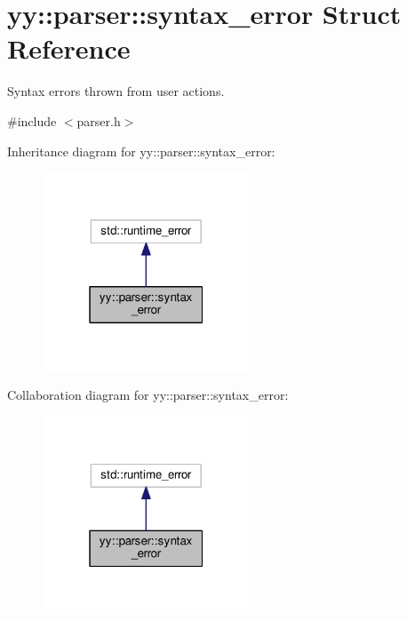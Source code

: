 \hypertarget{structyy_1_1parser_1_1syntax__error}{}\section{yy\+:\+:parser\+:\+:syntax\+\_\+error Struct Reference}
\label{structyy_1_1parser_1_1syntax__error}


Syntax errors thrown from user actions.  




{\ttfamily \#include $<$parser.\+h$>$}



Inheritance diagram for yy\+:\+:parser\+:\+:syntax\+\_\+error\+:
\nopagebreak
\begin{figure}[H]
\begin{center}
\leavevmode
\includegraphics[width=175pt]{structyy_1_1parser_1_1syntax__error__inherit__graph}
\end{center}
\end{figure}


Collaboration diagram for yy\+:\+:parser\+:\+:syntax\+\_\+error\+:
\nopagebreak
\begin{figure}[H]
\begin{center}
\leavevmode
\includegraphics[width=175pt]{structyy_1_1parser_1_1syntax__error__coll__graph}
\end{center}
\end{figure}
